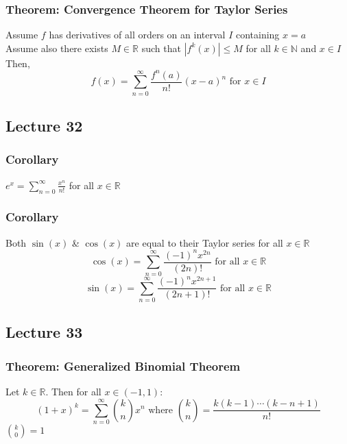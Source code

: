 \documentclass[12pt, letterpaper]{article}
\begin{document}
\subsubsection{Theorem: Convergence Theorem for Taylor Series}
Assume $f$ has derivatives of all orders on an interval $I$ containing $x=a$ \\
Assume also there exists $M\in\mathbb{R}$ such that $|f^{k}(x)|\leq M$ for all $k\in\mathbb{N}$ and $x\in I$ \\
Then, \[f(x) = \sum_{n=0}^{\infty}\frac{f^{n}(a)}{n!}(x-a)^n\text{ for $x\in I$}\]
\subsection{Lecture 32}
\subsubsection{Corollary}
$e^x = \displaystyle\sum_{n=0}^{\infty}\frac{x^n}{n!}$ for all $x\in\mathbb{R}$
\subsubsection{Corollary}
Both $\sin(x)$ \& $\cos(x)$ are equal to their Taylor series for all $x\in\mathbb{R}$
\[\cos(x) = \sum_{n=0}^{\infty}\frac{(-1)^nx^{2n}}{(2n)!} \text{ for all $x\in\mathbb{R}$}\]
\[\sin(x) = \sum_{n=0}^{\infty}\frac{(-1)^nx^{2n+1}}{(2n+1)!} \text{ for all $x\in\mathbb{R}$}\]
\subsection{Lecture 33}
\subsubsection{Theorem: Generalized Binomial Theorem}
Let $k\in\mathbb{R}$. Then for all $x\in(-1, 1)$: 
\[(1+x)^k = \sum_{n=0}^{\infty}{k\choose n}x^n \text{ where } {k\choose n} = \frac{k(k-1)\cdots(k-n+1)}{n!}\]
${k\choose 0} = 1$
\end{document}
